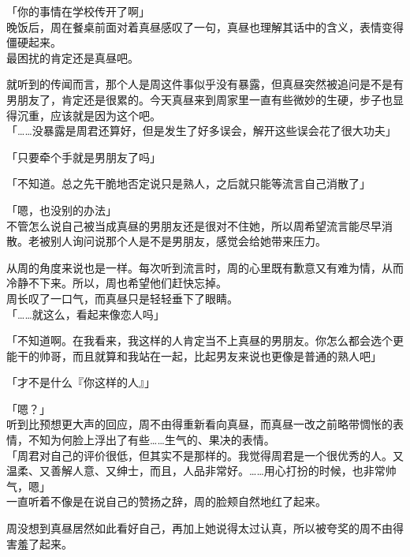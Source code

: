 「你的事情在学校传开了啊」\\

晚饭后，周在餐桌前面对着真昼感叹了一句，真昼也理解其话中的含义，表情变得僵硬起来。\\

最困扰的肯定还是真昼吧。

就听到的传闻而言，那个人是周这件事似乎没有暴露，但真昼突然被追问是不是有男朋友了，肯定还是很累的。今天真昼来到周家里一直有些微妙的生硬，步子也显得沉重，应该就是因为这个吧。\\

「……没暴露是周君还算好，但是发生了好多误会，解开这些误会花了很大功夫」

「只要牵个手就是男朋友了吗」

「不知道。总之先干脆地否定说只是熟人，之后就只能等流言自己消散了」

「嗯，也没别的办法」\\

不管怎么说自己被当成真昼的男朋友还是很对不住她，所以周希望流言能尽早消散。老被别人询问说那个人是不是男朋友，感觉会给她带来压力。

从周的角度来说也是一样。每次听到流言时，周的心里既有歉意又有难为情，从而冷静不下来。所以，周也希望他们赶快忘掉。\\

周长叹了一口气，而真昼只是轻轻垂下了眼睛。\\

「……就这么，看起来像恋人吗」

「不知道啊。在我看来，我这样的人肯定当不上真昼的男朋友。你怎么都会选个更能干的帅哥，而且就算和我站在一起，比起男友来说也更像是普通的熟人吧」

「才不是什么『你这样的人』」

「嗯？」\\

听到比预想更大声的回应，周不由得重新看向真昼，而真昼一改之前略带惆怅的表情，不知为何脸上浮出了有些……生气的、果决的表情。\\

「周君对自己的评价很低，但其实不是那样的。我觉得周君是一个很优秀的人。又温柔、又善解人意、又绅士，而且，人品非常好。……用心打扮的时候，也非常帅气，嗯」\\

一直听着不像是在说自己的赞扬之辞，周的脸颊自然地红了起来。

周没想到真昼居然如此看好自己，再加上她说得太过认真，所以被夸奖的周不由得害羞了起来。\\

